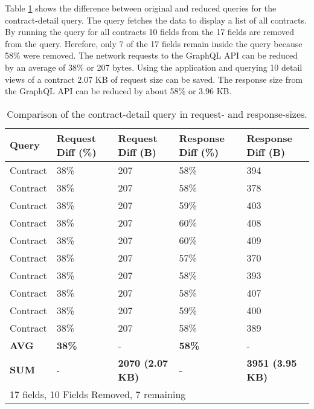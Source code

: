 \noindent Table \ref{table:code:comparison-contract-reduction} shows the difference between original and reduced queries for the contract-detail query. The query fetches the data to display a list of all contracts. By running the query for all contracts 10 fields from the 17 fields are removed from the query. Herefore, only 7 of the 17 fields remain inside the query because 58\% were removed. The network requests to the GraphQL \ac{API} can be reduced by an average of 38\% or 207 bytes. Using the application and querying 10 detail views of a contract 2.07 KB of request size can be saved. The response size from the GraphQL \ac{API} can be reduced by about 58\% or 3.96 KB.

\ifshowTables
\begin{table}[H]
  \begin{tabular}{|l|l|l|l|l|}
  \hline
  \textbf{Query} & \textbf{Request Diff (\%)}  & \textbf{Request Diff (B)} & \textbf{Response Diff (\%)} & \textbf{Response Diff (B)}  \\
  \hline
  Contract & 38\% & 207 & 58\% & 394 \\
  \hline
  Contract & 38\% & 207 & 58\% & 378 \\
  \hline
  Contract & 38\% & 207 & 59\% & 403 \\
  \hline
  Contract & 38\% & 207 & 60\% & 408 \\
  \hline
  Contract & 38\% & 207 & 60\% & 409 \\
  \hline
  Contract & 38\% & 207 & 57\% & 370 \\
  \hline
  Contract & 38\% & 207 & 58\% & 393 \\
  \hline
  Contract & 38\% & 207 & 58\% & 407 \\
  \hline
  Contract & 38\% & 207 & 59\% & 400 \\
  \hline
  Contract & 38\% & 207 & 58\% & 389 \\
  \hline
  \hline
  \textbf{AVG} & \textbf{38\%} & - & \textbf{58\%} & - \\
  \hline
  \hline
  \textbf{SUM} & - & \textbf{2070 (2.07 KB)} & - & \textbf{3951 (3.95 KB)} \\
  \hline
  \multicolumn{5}{l}{17 fields, 10 Fields Removed, 7 remaining}
  \end{tabular}
  \caption{Comparison of the contract-detail query in request- and response-sizes.}\label{table:code:comparison-contract-reduction}
\end{table}
\fi